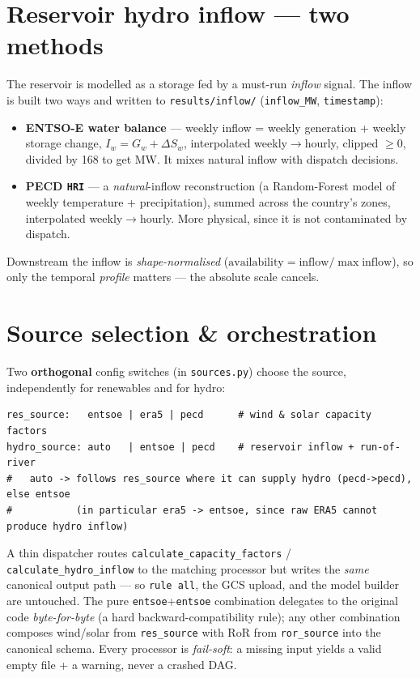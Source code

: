 \documentclass[11pt,a4paper]{article}
\begin{document}
\section{Reservoir hydro inflow --- two methods}
The reservoir is modelled as a storage fed by a must-run \emph{inflow} signal. The inflow is built two
ways and written to \texttt{results/inflow/} (\texttt{inflow\_MW}, \texttt{timestamp}):
\begin{itemize}[nosep]
  \item \textbf{ENTSO-E water balance} --- weekly inflow = weekly generation + weekly storage change,
        $I_w = G_w + \Delta S_w$, interpolated weekly$\to$hourly, clipped $\ge 0$, divided by 168 to get
        MW. It mixes natural inflow with dispatch decisions.
  \item \textbf{PECD \texttt{HRI}} --- a \emph{natural}-inflow reconstruction (a Random-Forest model of
        weekly temperature + precipitation), summed across the country's zones, interpolated
        weekly$\to$hourly. More physical, since it is not contaminated by dispatch.
\end{itemize}
Downstream the inflow is \emph{shape-normalised} ($\text{availability}=\text{inflow}/\max\text{inflow}$),
so only the temporal \emph{profile} matters --- the absolute scale cancels.

\section{Source selection \& orchestration}
Two \textbf{orthogonal} config switches (in \texttt{sources.py}) choose the source, independently for
renewables and for hydro:
\begin{lstlisting}
res_source:   entsoe | era5 | pecd      # wind & solar capacity factors
hydro_source: auto   | entsoe | pecd    # reservoir inflow + run-of-river
#   auto -> follows res_source where it can supply hydro (pecd->pecd), else entsoe
#           (in particular era5 -> entsoe, since raw ERA5 cannot produce hydro inflow)
\end{lstlisting}
A thin dispatcher routes \texttt{calculate\_capacity\_factors} / \texttt{calculate\_hydro\_inflow} to the
matching processor but writes the \emph{same} canonical output path --- so \texttt{rule all}, the GCS
upload, and the model builder are untouched. The pure \texttt{entsoe}+\texttt{entsoe} combination
delegates to the original code \emph{byte-for-byte} (a hard backward-compatibility rule); any other
combination composes wind/solar from \texttt{res\_source} with RoR from \texttt{ror\_source} into the
canonical schema. Every processor is \emph{fail-soft}: a missing input yields a valid empty file + a
warning, never a crashed DAG.
\end{document}
